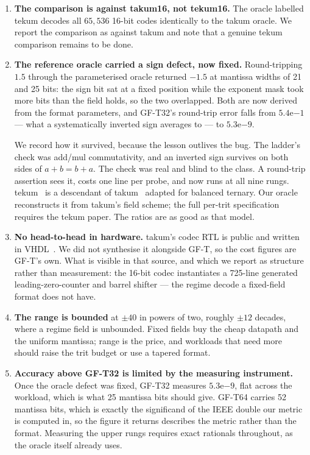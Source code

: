 \documentclass[11pt]{article}
\theoremstyle{definition}
\begin{document}
\begin{enumerate}[leftmargin=*]
\item \textbf{The comparison is against takum16, not tekum16.} The oracle
labelled tekum decodes all $65{,}536$ 16-bit codes identically to the takum
oracle. We report the comparison as against takum and note that a genuine tekum
comparison remains to be done.

\item \textbf{The reference oracle carried a sign defect, now fixed.} Round-tripping
$1.5$ through the parameterised oracle returned $-1.5$ at mantissa widths of 21
and 25 bits: the sign bit sat at a fixed position while the exponent mask took
more bits than the field holds, so the two overlapped. Both are now derived from
the format parameters, and GF-T32's round-trip error falls from
$5.4\mathrm{e}{-1}$ --- what a systematically inverted sign averages to --- to
$5.3\mathrm{e}{-9}$.

We record how it survived, because the lesson outlives the bug. The ladder's
check was add/mul commutativity, and an inverted sign survives on both sides of
$a+b=b+a$. The check was real and blind to the class. A round-trip assertion sees
it, costs one line per probe, and now runs at all nine rungs. tekum~\cite{tekum} is a descendant of takum~\cite{takum} adapted for balanced
ternary. Our
oracle reconstructs it from takum's field scheme; the full per-trit
specification requires the tekum paper. The ratios are as good as that model.

\item \textbf{No head-to-head in hardware.} takum's codec RTL is public and
written in VHDL~\cite{takumrtl}. We did not synthesise it alongside GF-T, so the cost figures are
GF-T's own. What is visible in that source, and which we report as structure
rather than measurement: the 16-bit codec instantiates a 725-line generated
leading-zero-counter and barrel shifter --- the regime decode a fixed-field
format does not have.

\item \textbf{The range is bounded} at $\pm40$ in powers of two, roughly $\pm12$
decades, where a regime field is unbounded. Fixed fields buy the cheap datapath
and the uniform mantissa; range is the price, and workloads that need more should
raise the trit budget or use a tapered format.

\item \textbf{Accuracy above GF-T32 is limited by the measuring instrument.}
Once the oracle defect was fixed, GF-T32 measures $5.3\mathrm{e}{-9}$, flat
across the workload, which is what 25 mantissa bits should give. GF-T64 carries
52 mantissa bits, which is exactly the significand of the IEEE double our metric
is computed in, so the figure it returns describes the metric rather than the
format. Measuring the upper rungs requires exact rationals throughout, as the
oracle itself already uses.


\end{enumerate}
\end{document}
